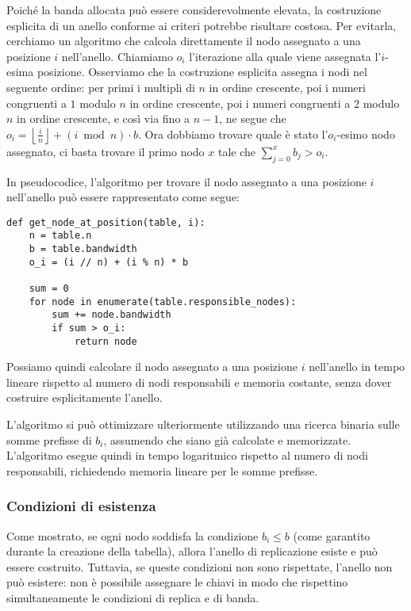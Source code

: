 Poiché la banda allocata può essere considerevolmente elevata, la costruzione esplicita di un anello conforme ai criteri potrebbe risultare costosa.
Per evitarla, cerchiamo un algoritmo che calcola direttamente il nodo assegnato a una posizione $i$ nell'anello.
Chiamiamo $o_i$ l'iterazione alla quale viene assegnata l'$i$-esima posizione.
Osserviamo che la costruzione esplicita assegna i nodi nel seguente ordine: per primi i multipli di $n$ in ordine crescente, poi i numeri congruenti a $1$ modulo $n$ in ordine crescente, poi i numeri congruenti a $2$ modulo $n$ in ordine crescente, e così via fino a $n-1$, ne segue che $\displaystyle o_i = \left\lfloor \frac{i}{n} \right\rfloor + (i \bmod n) \cdot b$.
Ora dobbiamo trovare quale è stato l'$o_i$-esimo nodo assegnato, ci basta trovare il primo nodo $x$ tale che $\displaystyle \sum_{j=0}^{x} b_j > o_i$.

In pseudocodice, l'algoritmo per trovare il nodo assegnato a una posizione $i$ nell'anello può essere rappresentato come segue:
\begin{verbatim}
def get_node_at_position(table, i):
    n = table.n
    b = table.bandwidth
    o_i = (i // n) + (i % n) * b

    sum = 0
    for node in enumerate(table.responsible_nodes):
        sum += node.bandwidth
        if sum > o_i:
            return node
\end{verbatim}

Possiamo quindi calcolare il nodo assegnato a una posizione $i$ nell'anello in tempo lineare rispetto al numero di nodi responsabili e memoria costante, senza dover costruire esplicitamente l'anello.

L'algoritmo si può ottimizzare ulteriormente utilizzando una ricerca binaria sulle somme prefisse di $b_i$, assumendo che siano già calcolate e memorizzate.
L'algoritmo esegue quindi in tempo logaritmico rispetto al numero di nodi responsabili, richiedendo memoria lineare per le somme prefisse.

\subsubsection{Condizioni di esistenza}
\label{subsubsec:esistenza}

Come mostrato, se ogni nodo soddisfa la condizione $b_i \leq b$ (come garantito durante la creazione della tabella), allora l'anello di replicazione esiste e può essere costruito.
Tuttavia, se queste condizioni non sono rispettate, l'anello non può esistere: non è possibile assegnare le chiavi in modo che rispettino simultaneamente le condizioni di replica e di banda.

